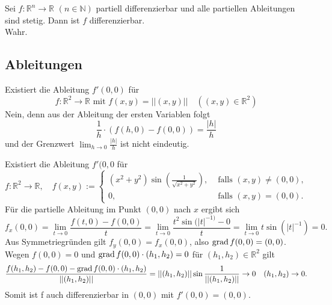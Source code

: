 Sei $f : \mathbb{R}^n \to \mathbb{R}$ $(n \in \mathbb{N})$ partiell differenzierbar und alle partiellen Ableitungen sind stetig.
Dann ist $f$ differenzierbar.\\
Wahr.

\subsection{Ableitungen}
Existiert die Ableitung $f'(0,0)$ für
\begin{displaymath}
  f : \mathbb{R}^2 \to \mathbb{R} \text{ mit } f(x,y) = ||(x,y)|| \quad ((x,y) \in \mathbb{R}^2)
\end{displaymath}
Nein, denn aus der Ableitung der ersten Variablen folgt
\begin{displaymath}
  \frac{1}{h} \cdot (f(h, 0) - f(0,0)) = \frac{|h|}{h}
\end{displaymath}
und der Grenzwert $\lim_{h \to 0} \frac{|h|}{h}$ ist nicht eindeutig.

Existiert die Ableitung $f'(0,0$ für
\begin{displaymath}
  f : \mathbb{R}^2 \to \mathbb{R}, \quad f(x,y) :=
  \begin{cases}
    (x^2 + y^2) \sin\left(\frac{1}{\sqrt{x^2 + y^2}}\right),& \text{ falls } (x,y) \neq (0,0),\\
    0,& \text{ falls } (x,y) = (0,0).
  \end{cases}
\end{displaymath}
Für die partielle Ableitung im Punkt $(0,0)$ nach $x$ ergibt sich
\begin{displaymath}
  f_x(0,0) = \lim_{t \to 0} \frac{f(t,0) - f(0,0)}{t} = \lim_{t \to 0} \frac{t^2 \sin(|t|^{-1)} - 0}{t} = \lim_{t \to 0} t \sin(|t|^{-1}) = 0.
\end{displaymath}
Aus Symmetriegründen gilt $f_y(0,0) = f_x(0,0)$, also $\operatorname{grad} f(0,0) = (0,0)$.
Wegen $f(0,0) = 0$ und $\operatorname{grad} f(0,0) \cdot (h_1, h_2) = 0$ für $(h_1, h_2) \in \mathbb{R}^2$ gilt
\begin{displaymath}
  \frac{f(h_1, h_2) - f(0,0) - \operatorname{grad} f(0,0) \cdot (h_1, h_2)}{||(h_1, h_2)||} = ||(h_1, h_2)|| \sin \frac{1}{||(h_1, h_2)||} \to 0 \quad (h_1, h_2) \to 0.
\end{displaymath}
Somit ist f auch differenzierbar in $(0,0)$ mit $f'(0,0) = (0,0)$.